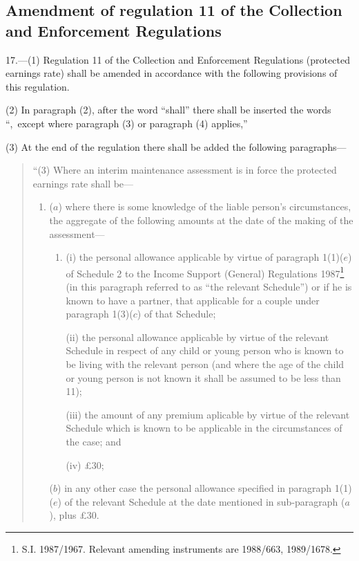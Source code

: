 \documentclass[a4paper]{article}
\begin{document}
\subsection[17. Amendment of regulation 11 of the Collection and Enforcement Regulations]{Amendment of regulation 11 of the Collection and Enforcement Regulations}

17.—(1) Regulation 11 of the Collection and Enforcement Regulations (protected earnings rate) shall be amended in accordance with the following provisions of this regulation.

(2) In paragraph (2), after the word “shall” there shall be inserted the words ``,~except where paragraph (3) or paragraph (4) applies,”

(3) At the end of the regulation there shall be added the following paragraphs—
\begin{quotation}
“(3) Where an interim maintenance assessment is in force the protected earnings rate shall be—
\begin{enumerate}\item[]
($a$) where there is some knowledge of the liable person’s circumstances, the aggregate of the following amounts at the date of the making of the assessment—
\begin{enumerate}\item[]
(i) the personal allowance applicable by virtue of paragraph 1(1)($e$) of Schedule 2 to the Income Support (General) Regulations 1987\footnote{\frenchspacing S.I. 1987/1967. Relevant amending instruments are 1988/663, 1989/1678.} (in this paragraph referred to as “the relevant Schedule”) or if he is known to have a partner, that applicable for a couple under paragraph 1(3)($c$) of that Schedule;

(ii) the personal allowance applicable by virtue of the relevant Schedule in respect of any child or young person who is known to be living with the relevant person (and where the age of the child or young person is not known it shall be assumed to be less than 11);

(iii) the amount of any premium aplicable by virtue of the relevant Schedule which is known to be applicable in the circumstances of the case; and

(iv) £30;
\end{enumerate}

($b$) in any other case the personal allowance specified in paragraph 1(1)($e$) of the relevant Schedule at the date mentioned in sub-paragraph ($a$), plus £30.
\end{enumerate}


\end{quotation}
\end{document}
